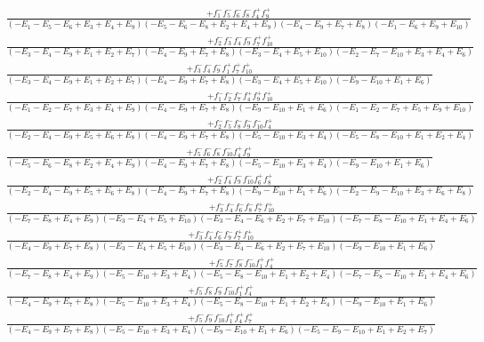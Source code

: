 \documentclass{article}
\begin{document}
\[\begin{array}{rcl}
\frac{+f_{1}^{-}f_{5}^{-}f_{6}^{-}f_{8}^{-}f_{4}^{+}f_{9}^{+}}{(-E_{1}-E_{5}-E_{6}+E_{3}+E_{4}+E_{9})(-E_{5}-E_{6}-E_{8}+E_{2}+E_{4}+E_{9})(-E_{4}-E_{9}+E_{7}+E_{8})(-E_{1}-E_{6}+E_{9}+E_{10})}\\
\frac{+f_{2}^{-}f_{3}^{-}f_{4}^{-}f_{9}^{-}f_{7}^{+}f_{10}^{+}}{(-E_{3}-E_{4}-E_{9}+E_{1}+E_{2}+E_{7})(-E_{4}-E_{9}+E_{7}+E_{8})(-E_{3}-E_{4}+E_{5}+E_{10})(-E_{2}-E_{7}-E_{10}+E_{3}+E_{4}+E_{6})}\\
\frac{+f_{3}^{-}f_{4}^{-}f_{9}^{-}f_{1}^{+}f_{7}^{+}f_{10}^{+}}{(-E_{3}-E_{4}-E_{9}+E_{1}+E_{2}+E_{7})(-E_{4}-E_{9}+E_{7}+E_{8})(-E_{3}-E_{4}+E_{5}+E_{10})(-E_{9}-E_{10}+E_{1}+E_{6})}\\
\frac{+f_{1}^{-}f_{2}^{-}f_{7}^{-}f_{4}^{+}f_{9}^{+}f_{10}^{+}}{(-E_{1}-E_{2}-E_{7}+E_{3}+E_{4}+E_{9})(-E_{4}-E_{9}+E_{7}+E_{8})(-E_{9}-E_{10}+E_{1}+E_{6})(-E_{1}-E_{2}-E_{7}+E_{5}+E_{9}+E_{10})}\\
\frac{+f_{2}^{-}f_{5}^{-}f_{8}^{-}f_{9}^{-}f_{10}^{-}f_{4}^{+}}{(-E_{2}-E_{4}-E_{9}+E_{5}+E_{6}+E_{8})(-E_{4}-E_{9}+E_{7}+E_{8})(-E_{5}-E_{10}+E_{3}+E_{4})(-E_{5}-E_{8}-E_{10}+E_{1}+E_{2}+E_{4})}\\
\frac{+f_{5}^{-}f_{6}^{-}f_{8}^{-}f_{10}^{-}f_{4}^{+}f_{9}^{+}}{(-E_{5}-E_{6}-E_{8}+E_{2}+E_{4}+E_{9})(-E_{4}-E_{9}+E_{7}+E_{8})(-E_{5}-E_{10}+E_{3}+E_{4})(-E_{9}-E_{10}+E_{1}+E_{6})}\\
\frac{+f_{2}^{-}f_{4}^{-}f_{9}^{-}f_{10}^{-}f_{6}^{+}f_{8}^{+}}{(-E_{2}-E_{4}-E_{9}+E_{5}+E_{6}+E_{8})(-E_{4}-E_{9}+E_{7}+E_{8})(-E_{9}-E_{10}+E_{1}+E_{6})(-E_{2}-E_{9}-E_{10}+E_{3}+E_{6}+E_{8})}\\
\frac{+f_{3}^{-}f_{4}^{-}f_{6}^{-}f_{8}^{-}f_{7}^{+}f_{10}^{+}}{(-E_{7}-E_{8}+E_{4}+E_{9})(-E_{3}-E_{4}+E_{5}+E_{10})(-E_{3}-E_{4}-E_{6}+E_{2}+E_{7}+E_{10})(-E_{7}-E_{8}-E_{10}+E_{1}+E_{4}+E_{6})}\\
\frac{+f_{3}^{-}f_{4}^{-}f_{6}^{-}f_{9}^{-}f_{7}^{+}f_{10}^{+}}{(-E_{4}-E_{9}+E_{7}+E_{8})(-E_{3}-E_{4}+E_{5}+E_{10})(-E_{3}-E_{4}-E_{6}+E_{2}+E_{7}+E_{10})(-E_{9}-E_{10}+E_{1}+E_{6})}\\
\frac{+f_{5}^{-}f_{7}^{-}f_{8}^{-}f_{10}^{-}f_{1}^{+}f_{4}^{+}}{(-E_{7}-E_{8}+E_{4}+E_{9})(-E_{5}-E_{10}+E_{3}+E_{4})(-E_{5}-E_{8}-E_{10}+E_{1}+E_{2}+E_{4})(-E_{7}-E_{8}-E_{10}+E_{1}+E_{4}+E_{6})}\\
\frac{+f_{5}^{-}f_{8}^{-}f_{9}^{-}f_{10}^{-}f_{1}^{+}f_{4}^{+}}{(-E_{4}-E_{9}+E_{7}+E_{8})(-E_{5}-E_{10}+E_{3}+E_{4})(-E_{5}-E_{8}-E_{10}+E_{1}+E_{2}+E_{4})(-E_{9}-E_{10}+E_{1}+E_{6})}\\
\frac{+f_{5}^{-}f_{9}^{-}f_{10}^{-}f_{1}^{+}f_{4}^{+}f_{7}^{+}}{(-E_{4}-E_{9}+E_{7}+E_{8})(-E_{5}-E_{10}+E_{3}+E_{4})(-E_{9}-E_{10}+E_{1}+E_{6})(-E_{5}-E_{9}-E_{10}+E_{1}+E_{2}+E_{7})}\\

\end{array}\]
\end{document}
